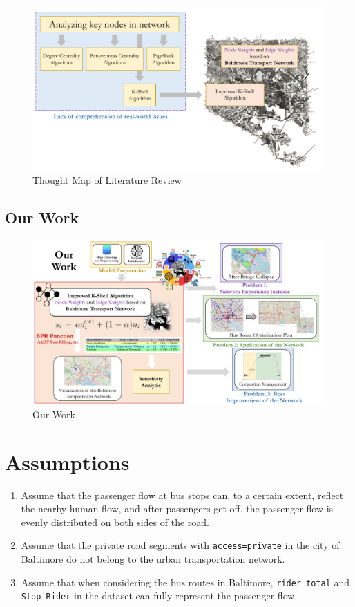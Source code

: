 \documentclass{mcmthesis}
\begin{document}
\begin{figure}[H]
  \centering
  \includegraphics[width=\textwidth]{figures/zongshu.pdf}
  \caption{Thought Map of Literature Review}
  \label{fig:zongshu}
\end{figure}


\subsection{Our Work}

\begin{figure}[H]
  \centering
  \includegraphics[width=\textwidth]{figures/ourwork.pdf}
  \caption{Our Work}
  \label{fig:ourwork}
\end{figure}

\section{Assumptions}

\begin{enumerate}
    \item Assume that the passenger flow at bus stops can, to a certain extent, reflect the nearby human flow, and after passengers get off, the passenger flow is evenly distributed on both sides of the road.
    \item Assume that the private road segments with \texttt{access=private} in the city of Baltimore do not belong to the urban transportation network.
    \item Assume that when considering the bus routes in Baltimore, \texttt{rider\_total} and \texttt{Stop\_Rider} in the dataset can fully represent the passenger flow.
\end{enumerate}
\end{document}
